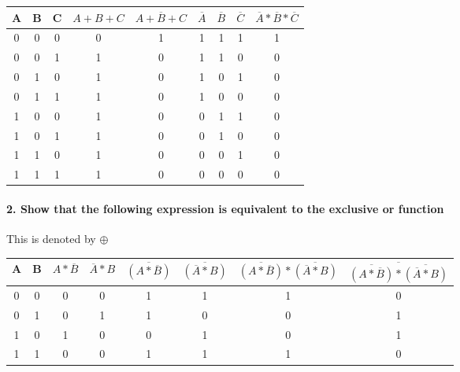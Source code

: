 \documentclass{article}
\begin{document}
\begin{enumerate}
	\begin{table}[H]
		\centering
		\begin{tabular}{|c|c|c|c|c|c|c|c|c|}
			\hline
			A & B & C & $A+B+C$ & $\overline{A+B+C}$ & $\overline{A}$ & $\overline{B}$ & $\overline{C}$ & $\overline{A}*\overline{B}*\overline{C}$ \\\hline
			0 & 0 & 0 & 0     & 1                & 1            & 1            & 1   	  & 1                                      \\\hline
			0 & 0 & 1 & 1     & 0                & 1            & 1            & 0            & 0                                      \\\hline
			0 & 1 & 0 & 1     & 0                & 1            & 0            & 1            & 0                                      \\\hline
			0 & 1 & 1 & 1     & 0                & 1            & 0            & 0            & 0                                      \\\hline
			1 & 0 & 0 & 1     & 0                & 0            & 1            & 1            & 0                                      \\\hline
			1 & 0 & 1 & 1     & 0                & 0            & 1            & 0            & 0                                      \\\hline
			1 & 1 & 0 & 1     & 0                & 0            & 0            & 1            & 0                                      \\\hline
			1 & 1 & 1 & 1     & 0                & 0            & 0            & 0            & 0                                      \\\hline
		\end{tabular}
	\end{table}
\end{enumerate}

\paragraph{2. Show that the following expression is equivalent to the exclusive or function}

This is denoted by $\oplus$

\begin{table}[H]
	\centering
	\begin{tabular}{|c|c|c|c|c|c|c|c|}
		\hline
		A & B & $A * \overline{B}$ & $\overline{A} * B$ & $\overline{(A * \overline{B})}$ & $\overline{(\overline{A} * B)}$ & $\overline{(A * \overline{B})} * \overline{(\overline{A} * B)}$ & $\overline{\overline{(A * \overline{B})} * \overline{(\overline{A} * B)}}$\\\hline
		0 & 0 & 0 & 0 & 1 & 1 & 1 & 0\\\hline
		0 & 1 & 0 & 1 & 1 & 0 & 0 & 1\\\hline
		1 & 0 & 1 & 0 & 0 & 1 & 0 & 1\\\hline
		1 & 1 & 0 & 0 & 1 & 1 & 1 & 0\\\hline
	\end{tabular}
\end{table}
\end{document}
